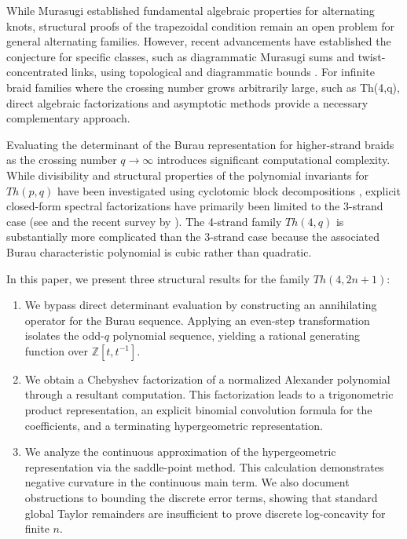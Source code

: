 \documentclass[11pt]{article}
\begin{document}
While Murasugi \cite{Murasugi1958} established fundamental algebraic properties for alternating knots, structural proofs of the trapezoidal condition remain an open problem for general alternating families. However, recent advancements have established the conjecture for specific classes, such as diagrammatic Murasugi sums and twist-concentrated links, using topological and diagrammatic bounds \cite{azarpendar2024foxstrapezoidalconjecture}. For infinite braid families where the crossing number grows arbitrarily large, such as Th(4,q), direct algebraic factorizations and asymptotic methods provide a necessary complementary approach.

Evaluating the determinant of the Burau representation \cite{Burau1936} for higher-strand braids as the crossing number $q \to \infty$ introduces significant computational complexity. While divisibility and structural properties of the polynomial invariants for $Th(p,q)$ have been investigated using cyclotomic block decompositions \cite{Takemura2018}, explicit closed-form spectral factorizations have primarily been limited to the 3-strand case (see \cite{AlSukaiti2023} and the recent survey by \cite{diprisa2024turksheadknotslinks}). The 4-strand family $Th(4,q)$ is substantially more complicated than the 3-strand case because the associated Burau characteristic polynomial is cubic rather than quadratic. 

In this paper, we present three structural results for the family $Th(4,2n+1)$:
\begin{enumerate}
    \item We bypass direct determinant evaluation by constructing an annihilating operator for the Burau sequence. Applying an even-step transformation isolates the odd-$q$ polynomial sequence, yielding a rational generating function over $\mathbb{Z}[t, t^{-1}]$. 
    \item We obtain a Chebyshev factorization of a normalized Alexander polynomial through a resultant computation. This factorization leads to a trigonometric product representation, an explicit binomial convolution formula for the coefficients, and a terminating hypergeometric representation.
    \item We analyze the continuous approximation of the hypergeometric representation via the saddle-point method. This calculation demonstrates negative curvature in the continuous main term. We also document obstructions to bounding the discrete error terms, showing that standard global Taylor remainders are insufficient to prove discrete log-concavity for finite $n$.
\end{enumerate}
\end{document}
